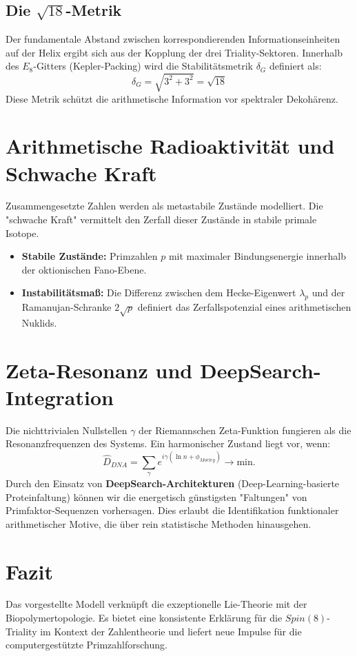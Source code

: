 \documentclass[11pt,a4paper]{article}
\newcommand{\SpinEight}{Spin(8)}
\begin{document}
	\subsection{Die $\sqrt{18}$-Metrik}
	Der fundamentale Abstand zwischen korrespondierenden Informationseinheiten auf der Helix ergibt sich aus der Kopplung der drei Triality-Sektoren. Innerhalb des $E_8$-Gitters (Kepler-Packing) wird die Stabilitätsmetrik $\delta_{G}$ definiert als:
	\begin{equation}
		\delta_{G} = \sqrt{3^2 + 3^2} = \sqrt{18}
	\end{equation}
	Diese Metrik schützt die arithmetische Information vor spektraler Dekohärenz.
	
	\section{Arithmetische Radioaktivität und Schwache Kraft}
	Zusammengesetzte Zahlen werden als metastabile Zustände modelliert. Die "schwache Kraft" vermittelt den Zerfall dieser Zustände in stabile primale Isotope. 
	\begin{itemize}
		\item \textbf{Stabile Zustände:} Primzahlen $p$ mit maximaler Bindungsenergie innerhalb der oktionischen Fano-Ebene.
		\item \textbf{Instabilitätsmaß:} Die Differenz zwischen dem Hecke-Eigenwert $\lambda_p$ und der Ramanujan-Schranke $2\sqrt{p}$ definiert das Zerfallspotenzial eines arithmetischen Nuklids.
	\end{itemize}
	
	\section{Zeta-Resonanz und DeepSearch-Integration}
	Die nichttrivialen Nullstellen $\gamma$ der Riemannschen Zeta-Funktion fungieren als die Resonanzfrequenzen des Systems. Ein harmonischer Zustand liegt vor, wenn:
	\begin{equation}
		\hat{D}_{DNA} = \sum_{\gamma} e^{i \gamma (\ln n + \phi_{Morley})} \to \text{min.}
	\end{equation}
	Durch den Einsatz von \textbf{DeepSearch-Architekturen} (Deep-Learning-basierte Proteinfaltung) können wir die energetisch günstigsten "Faltungen" von Primfaktor-Sequenzen vorhersagen. Dies erlaubt die Identifikation funktionaler arithmetischer Motive, die über rein statistische Methoden hinausgehen.
	
	\section{Fazit}
	Das vorgestellte Modell verknüpft die exzeptionelle Lie-Theorie mit der Biopolymertopologie. Es bietet eine konsistente Erklärung für die $\SpinEight$-Triality im Kontext der Zahlentheorie und liefert neue Impulse für die computergestützte Primzahlforschung.
	
\end{document}
